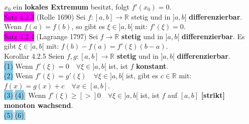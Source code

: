 \documentclass[landscape, 10pt]{article}
\newcommand{\R}{\mathbb{R}}
\begin{document}
\begin{multicols}{3}
                            \textcolor{NavyBlue}{$x_0$} ein 
                            \textbf{lokales Extremum} 
                            besitzt, folgt \textcolor{NavyBlue}{$f'(x_0)=0$}.\\
              \colorbox{magenta}{Satz 4.2.3} 
              (Rolle 1690) 
                     Sei \textcolor{NavyBlue}{$f:[a,b]\longrightarrow\R$}
                     stetig und in \textcolor{NavyBlue}{$]a,b[$} 
                     \textbf{differenzierbar}. 
                     Wenn \textcolor{NavyBlue}{$f(a)=f(b)$}, so gibt es 
                     \textcolor{NavyBlue}{$\xi\in]a,b[$} mit: 
                     \textcolor{NavyBlue}{$f'(\xi)=0$}.\\
              \colorbox{magenta}{Satz 4.2.4}
              (Lagrange 1797) 
                     Sei \textcolor{NavyBlue}{$f\longrightarrow\R$}
                     \textbf{stetig} und in \textcolor{NavyBlue}{$]a,b[$} 
                     \textbf{differenzierbar}. 
                     Es gibt \textcolor{NavyBlue}{$\xi\in]a,b[$} mit: 
                     \textcolor{NavyBlue}{$f(b)-f(a)=f'(\xi)(b-a)$}.\\
              \colorbox{BurntOrange}{Korollar 4.2.5} 
                     Seien \textcolor{NavyBlue}{$f,g:[a,b]\longrightarrow\R$}
                     \textbf{stetig} und in \textcolor{NavyBlue}{$]a,b[$} 
                     \textbf{differenzierbar}.\\
                     \colorbox{SkyBlue}{(1)} Wenn 
                            \textcolor{NavyBlue}{$f'(\xi)=0\quad\forall\xi\in]a,b[$} ist, 
                            ist \textcolor{NavyBlue}{$f$} \textbf{konstant}.\\
                     \colorbox{SkyBlue}{(2)} Wenn 
                            \textcolor{NavyBlue}{$f'(\xi)=g'(\xi)\quad\forall\xi\in]a,b[$} 
                            ist, gibt es \textcolor{NavyBlue}{$c\in\R$} mit: 
                            \textcolor{NavyBlue}{
                            $f(x)=g(x)+c\quad\forall x\in[a,b]$}.\\
                     \colorbox{SkyBlue}{(3)}[\colorbox{SkyBlue}{(4)}] 
                            Wenn \textcolor{NavyBlue}{
                            $f'(\xi)\geqslant[>]0\quad\forall\xi\in]a,b[$} ist, 
                            ist \textcolor{NavyBlue}{$f$} auf 
                            \textcolor{NavyBlue}{$[a,b]$} 
                            \textbf{[strikt] monoton wachsend}.\\
                     \colorbox{SkyBlue}{(5)}[\colorbox{SkyBlue}{(6)}] 

\end{multicols}
\end{document}
